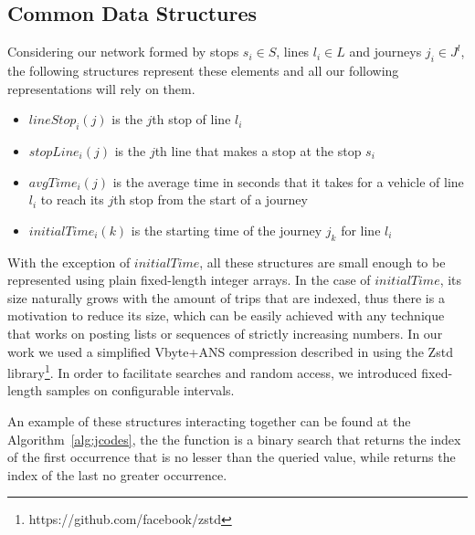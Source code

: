     \subsection{Common Data Structures}
    \label{sec:cs}
    Considering our network formed by stops $s_i \in S$, lines $l_i \in L$ and journeys $j_i \in J^l$, the following structures represent these elements and all our following representations will rely on them.
    
    \begin{itemize}
        \item $lineStop_i(j)$ is the $j$th stop of line $l_i$
        \item $stopLine_i(j)$ is the $j$th line that makes a stop at the stop $s_i$
        \item $avgTime_i(j)$ is the average time in seconds that it takes for a vehicle of line $l_i$ to reach its $j$th stop from the start of a journey
        \item $initialTime_i(k)$ is the starting time of the journey $j_k$ for line $l_i$
    \end{itemize}
    
    With the exception of $initialTime$, all these structures are small enough to be represented using plain fixed-length integer arrays. In the case of $initialTime$, its size naturally grows with the amount of trips that are indexed, thus there is a motivation to reduce its size, which can be easily achieved with any technique that works on posting lists or sequences of strictly increasing numbers. In our work we used a simplified Vbyte+ANS compression described in \cite{moffat2017ans} using the Zstd library\footnote{https://github.com/facebook/zstd}. In order to facilitate searches and random access, we introduced fixed-length samples on configurable intervals.
    
    An example of these structures interacting together can be found at the Algorithm~\ref{alg:jcodes}, the the function  is a binary search that returns the index of the first occurrence that is no lesser than the queried value, while  returns the index of the last no greater occurrence.
    
